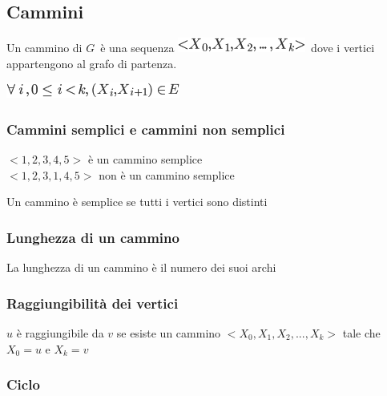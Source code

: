 \documentclass{article}
\begin{document}
{\hypertarget{h.lxvflhr4q9d8}{\subsection{\texorpdfstring{{Cammini}}{Cammini}}\label{h.lxvflhr4q9d8}}

{Un cammino di }$G${~è una sequenza
}\includegraphics{images/image347.png}{~dove i vertici appartengono al
grafo di partenza. }

\includegraphics{images/image348.png}

\hypertarget{h.sjz08mn040is}{\subsubsection{\texorpdfstring{{Cammini
semplici e cammini non
semplici}}{Cammini semplici e cammini non semplici}}\label{h.sjz08mn040is}}


$<1,2,3,4,5>$ è un cammino semplice\\
$<1,2,3,1,4,5>$ non è un cammino semplice

{Un cammino è semplice se tutti i vertici sono distinti}

\hypertarget{h.e18ltelmo48z}{\subsubsection{\texorpdfstring{{Lunghezza
di un cammino}}{Lunghezza di un cammino}}\label{h.e18ltelmo48z}}

{La lunghezza di un cammino è il numero dei suoi archi}

\hypertarget{h.4bm9pdnjdb2q}{\subsubsection{\texorpdfstring{{Raggiungibilità
dei vertici}}{Raggiungibilità dei vertici}}\label{h.4bm9pdnjdb2q}}

$u$ è raggiungibile da $v$ se esiste un cammino $<X_0,X_1,X_2,...,X_k>$ tale che $X_0 = u$ e $X_k = v$

\hypertarget{h.4fm287mz4am5}{\subsubsection{\texorpdfstring{{Ciclo}}{Ciclo}}\label{h.4fm287mz4am5}}

}
\end{document}
